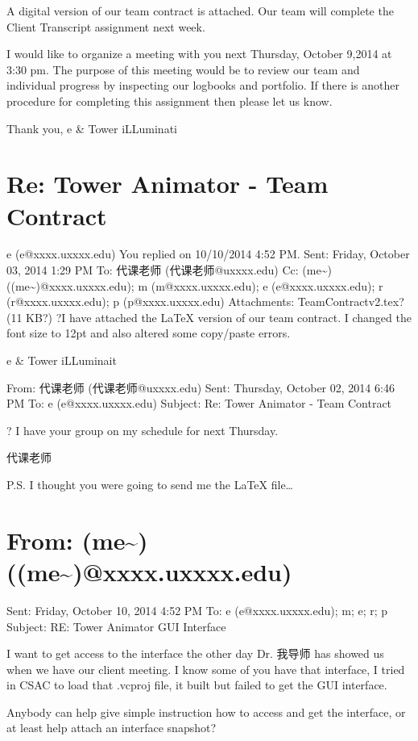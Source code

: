 \documentclass[12pt]{book}
\begin{document}
A digital version of our team contract is attached. Our team will complete the Client Transcript assignment next week.

I would like to organize a meeting with you next Thursday, October 9,2014 at 3:30 pm. The purpose of this meeting would be to review our team and individual progress by inspecting our logbooks and portfolio. If there is another procedure for completing this assignment then please let us know.  

Thank you,
e
\&
Tower iLLuminati

\section{Re: Tower Animator - Team Contract}
\label{sec-14-2}
e (e@xxxx.uxxxx.edu)
You replied on 10/10/2014 4:52 PM.
Sent:        Friday, October 03, 2014 1:29 PM
To:        
代课老师 (代课老师@uxxxx.edu)
Cc:        
(me\textasciitilde{}) ((me\textasciitilde{})@xxxx.uxxxx.edu); m (m@xxxx.uxxxx.edu); e (e@xxxx.uxxxx.edu); r (r@xxxx.uxxxx.edu); p (p@xxxx.uxxxx.edu)
Attachments:        
TeamContract\textunderscore v2.tex? (11 KB?)
?I have attached the \LaTeX{} version of our team contract. I changed the font size to 12pt and also altered some copy/paste errors.

e
\&
Tower iLLuminait

From: 代课老师 (代课老师@uxxxx.edu)
Sent: Thursday, October 02, 2014 6:46 PM
To: e (e@xxxx.uxxxx.edu)
Subject: Re: Tower Animator - Team Contract

?
I have your group on my schedule for next Thursday.

代课老师

P.S.  I thought you were going to send me the \LaTeX{} file\ldots{}

\section{From: (me\textasciitilde{}) ((me\textasciitilde{})@xxxx.uxxxx.edu)}
\label{sec-14-3}
Sent: Friday, October 10, 2014 4:52 PM
To: e (e@xxxx.uxxxx.edu); m; e; r; p
Subject: RE: Tower Animator \textunderscore GUI Interface

I want to get access to the interface the other day Dr. 我导师 has showed us when we have our client meeting. I know some of you have that interface, I tried in CSAC to load that .vcproj file, it built but failed to get the GUI interface.

Anybody can help give simple instruction how to access and get the interface, or at least help attach an interface snapshot?
\end{document}
